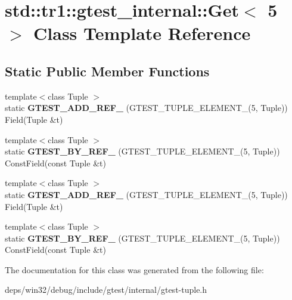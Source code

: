 \hypertarget{classstd_1_1tr1_1_1gtest__internal_1_1_get_3_015_01_4}{}\section{std\+:\+:tr1\+:\+:gtest\+\_\+internal\+:\+:Get$<$ 5 $>$ Class Template Reference}
\label{classstd_1_1tr1_1_1gtest__internal_1_1_get_3_015_01_4}
\subsection*{Static Public Member Functions}
\begin{DoxyCompactItemize}
\item 
\hypertarget{classstd_1_1tr1_1_1gtest__internal_1_1_get_3_015_01_4_a0a337088bab3f824f67d1607229fdcc2}{}{\footnotesize template$<$class Tuple $>$ }\\static {\bfseries G\+T\+E\+S\+T\+\_\+\+A\+D\+D\+\_\+\+R\+E\+F\+\_\+} (G\+T\+E\+S\+T\+\_\+\+T\+U\+P\+L\+E\+\_\+\+E\+L\+E\+M\+E\+N\+T\+\_\+(5, Tuple)) Field(Tuple \&t)\label{classstd_1_1tr1_1_1gtest__internal_1_1_get_3_015_01_4_a0a337088bab3f824f67d1607229fdcc2}

\item 
\hypertarget{classstd_1_1tr1_1_1gtest__internal_1_1_get_3_015_01_4_ae10fe16450db82d69b9a4d0b149ca75d}{}{\footnotesize template$<$class Tuple $>$ }\\static {\bfseries G\+T\+E\+S\+T\+\_\+\+B\+Y\+\_\+\+R\+E\+F\+\_\+} (G\+T\+E\+S\+T\+\_\+\+T\+U\+P\+L\+E\+\_\+\+E\+L\+E\+M\+E\+N\+T\+\_\+(5, Tuple)) Const\+Field(const Tuple \&t)\label{classstd_1_1tr1_1_1gtest__internal_1_1_get_3_015_01_4_ae10fe16450db82d69b9a4d0b149ca75d}

\item 
\hypertarget{classstd_1_1tr1_1_1gtest__internal_1_1_get_3_015_01_4_a0a337088bab3f824f67d1607229fdcc2}{}{\footnotesize template$<$class Tuple $>$ }\\static {\bfseries G\+T\+E\+S\+T\+\_\+\+A\+D\+D\+\_\+\+R\+E\+F\+\_\+} (G\+T\+E\+S\+T\+\_\+\+T\+U\+P\+L\+E\+\_\+\+E\+L\+E\+M\+E\+N\+T\+\_\+(5, Tuple)) Field(Tuple \&t)\label{classstd_1_1tr1_1_1gtest__internal_1_1_get_3_015_01_4_a0a337088bab3f824f67d1607229fdcc2}

\item 
\hypertarget{classstd_1_1tr1_1_1gtest__internal_1_1_get_3_015_01_4_ae10fe16450db82d69b9a4d0b149ca75d}{}{\footnotesize template$<$class Tuple $>$ }\\static {\bfseries G\+T\+E\+S\+T\+\_\+\+B\+Y\+\_\+\+R\+E\+F\+\_\+} (G\+T\+E\+S\+T\+\_\+\+T\+U\+P\+L\+E\+\_\+\+E\+L\+E\+M\+E\+N\+T\+\_\+(5, Tuple)) Const\+Field(const Tuple \&t)\label{classstd_1_1tr1_1_1gtest__internal_1_1_get_3_015_01_4_ae10fe16450db82d69b9a4d0b149ca75d}

\end{DoxyCompactItemize}


The documentation for this class was generated from the following file\+:\begin{DoxyCompactItemize}
\item 
deps/win32/debug/include/gtest/internal/gtest-\/tuple.\+h\end{DoxyCompactItemize}
